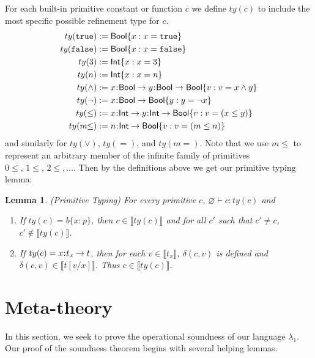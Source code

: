 \documentclass[11pt]{article}
\newtheorem{lemma}[theorem]{Lemma}
\newcommand{\bind}{\hspace{0.05em}{:}\hspace{0.05em}} %
\newcommand{\col}{\mathbin{:}}       %
\newcommand{\lb}{\llbracket}         %
\newcommand{\rb}{\rrbracket}         %
\newcommand{\true}{\mathtt{true}}
\newcommand{\Int}{{\sf Int}}
\newcommand{\Bool}{{\sf Bool}}
\newcommand{\functype}[3]{#1\bind #2 \rightarrow #3}
\begin{document}
For each built-in primitive constant or function $c$ we define $ty(c)$ to include the most specific possible refinement type for $c$.
\begin{align*}
ty(\true) :=&\; \Bool\{ x : x = \true \}\\
ty({\tt false}) :=&\; \Bool\{ x : x = {\tt false}\}\\
ty(3) :=&\; \Int\{ x : x = 3\} \\
ty(n) :=&\; \Int\{ x : x = n\} \\
ty(\wedge) :=&\; 	x\bind\Bool \rightarrow y\bind\Bool \rightarrow \Bool\{ v : v = x \wedge y\}\\
ty(\neg) :=&\; x\bind\Bool \rightarrow \Bool\{ y : y = \neg x\}\\
ty(\leq) :=&\; x\bind\Int \rightarrow y\bind\Int \rightarrow \Bool\{v : v = (x \leq y)\}\\
ty(m\!\!\leq) :=&\; n\bind\Int \rightarrow \Bool\{v : v = (m \leq n)\} 
\end{align*}
and similarly for $ty(\vee)$, $ty(=)$, and $ty(m\!\!=)$. Note that we use $m\!\!\leq$ to represent an arbitrary member of the infinite family of primitives $0\!\!\leq,\, 1\!\!\leq,\, 2\!\!\leq,\ldots$. Then by the definitions above we get our primitive typing lemma:
\begin{lemma}(Primitive Typing) For every primitive $c$, $\varnothing \vdash c : ty(c)$ and \label{prim-typing} 
\begin{enumerate}
\item If $ty(c) = b\{x \col p\}$, then $c \in \lb ty(c) \rb$ and for all $c'$ such that $c' \neq c$, $c' \not\in \lb ty(c)\rb$.
\item If $ty(c) = \functype{x}{t_x}{t}$, then for each $v \in \lb t_x\rb$, $\delta(c,v)$ is defined and $\delta(c,v) \in \lb t[v/x] \rb$. Thus $c \in \lb ty(c) \rb$.
\end{enumerate}
\end{lemma}

\section{Meta-theory}

In this section, we seek to prove the operational soundness of our language $\lambda_1$.
Our proof of the soundness theorem begins with several helping lemmas.
\end{document}
